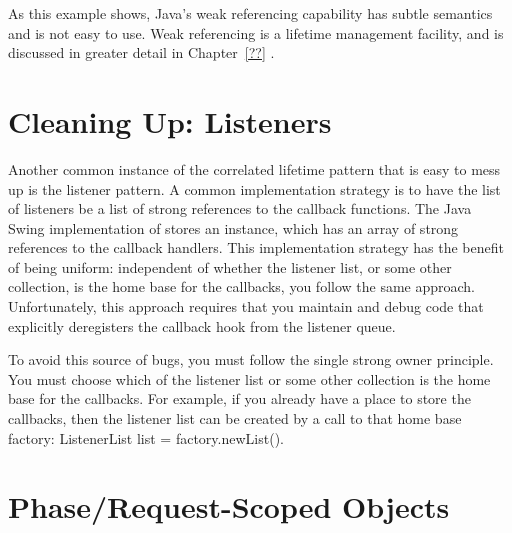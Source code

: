 As this example shows,  Java's weak referencing capability has subtle
semantics and is not easy to use. Weak referencing is a lifetime management
facility, and is discussed in greater detail in Chapter~\ref{??} .


\section{Cleaning Up: Listeners}


Another common instance of the correlated lifetime pattern that is easy to mess
up is the listener pattern. A common implementation strategy is to have the list
of listeners be a list of strong references to the callback functions. The Java
Swing implementation of  stores an 
instance, which has an array of strong references to the callback handlers. This
implementation strategy has the benefit of being uniform: independent of whether
the listener list, or some other collection, is the home base for the callbacks,
you follow the same approach. Unfortunately, this approach requires that you
maintain and debug code that explicitly deregisters the callback hook from the
listener queue.

To avoid this source of bugs, you must follow the single strong owner principle.
You must choose which of the listener list or some other collection is the home
base for the callbacks. For example, if you already have a place to store the
callbacks, then the listener list can be created by a call to that home base
factory: {ListenerList list = factory.newList()}.  

\section{Phase/Request-Scoped Objects}

